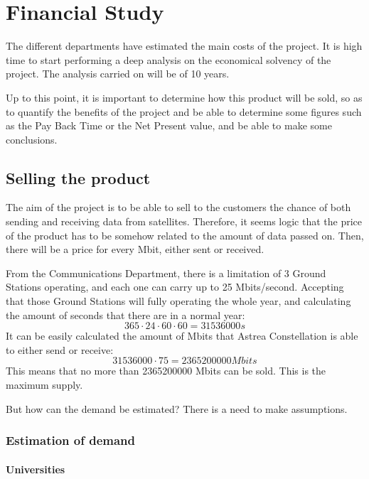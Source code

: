 \chapter{Financial Study}
\newpage
The different departments have estimated the main costs of the project. It is high time to start performing a deep analysis on the economical solvency of the project. The analysis carried on will be of 10 years. 

Up to this point, it is important to determine how this product will be sold, so as to quantify the benefits of the project and be able to determine some figures such as the Pay Back Time or the Net Present value, and be able to make some conclusions. 

\section{Selling the product}

The aim of the project is to be able to sell to the customers the chance of both sending and receiving data from satellites. Therefore, it seems logic that the price of the product has to be somehow related to the amount of data passed on. Then, there will be a price for every Mbit, either sent or received. 

From the Communications Department, there is a limitation of 3 Ground Stations operating, and each one can carry up to 25 Mbits/second. Accepting that those Ground Stations will fully operating the whole year, and calculating the amount of seconds that there are in a normal year:
\begin{equation}
365 \cdot 24 \cdot 60 \cdot 60 = 31536000 s
\end{equation}
It can be easily calculated the amount of Mbits that Astrea Constellation is able to either send or receive:
\begin{equation}
31536000 \cdot 75 = 2365200000 Mbits
\end{equation}
This means that no more than 2365200000 Mbits can be sold. This is the maximum supply.

But how can the demand be estimated? There is a need to make assumptions. 

\subsection{Estimation of demand}

\subsubsection{Universities}

